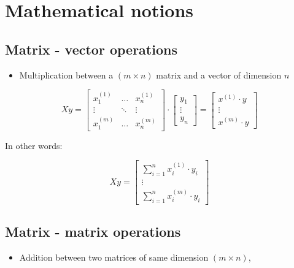 \documentclass{42-en}
\begin{document}
\newpage

\section*{Mathematical notions}
\subsection*{Matrix - vector operations}
\begin{itemize}
  \item Multiplication between a $(m \times n)$ matrix and a vector of dimension $n$
\end{itemize}

\begin{equation*}
  X y = 
  \begin{bmatrix}
    x^{(1)}_{1} & \dots& x^{(1)}_n \\ 
    \vdots & \ddots & \vdots \\ 
    x^{(m)}_1 & \dots & x^{(m)}_n
  \end{bmatrix}  
  \cdot
  \begin{bmatrix} 
    y_1 \\
    \vdots \\ 
    y_n 
  \end{bmatrix} 
  = 
  \begin{bmatrix}
    x^{(1)} \cdot y \\
    \vdots \\
    x^{(m)} \cdot y
  \end{bmatrix}
\end{equation*}


In other words:

$$
X y =
\begin{bmatrix}
  \sum_{i = 1}^{n} x_{i}^{(1)} \cdot y_i \\
  \vdots \\
 \sum_{i = 1}^{n} x_{i}^{(m)} \cdot y_i
\end{bmatrix}
$$

\subsection*{Matrix - matrix operations}
\begin{itemize}
  \item Addition between two matrices of same dimension $(m \times n)$,
\end{itemize}
\end{document}
